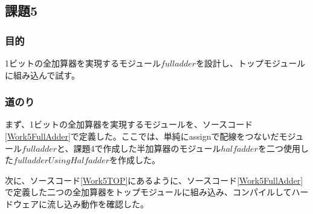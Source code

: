 \documentclass[a4paper]{jarticle}
\begin{document}
\subsection{課題5}
\subsubsection{目的}
1ビットの全加算器を実現するモジュール$fulladder$を設計し、トップモジュールに組み込んで試す。
\subsubsection{道のり}
まず、1ビットの全加算器を実現するモジュールを、ソースコード\ref{Work5FullAdder}で定義した。ここでは、単純にassignで配線をつないだモジュール$fulladder$と、課題4で作成した半加算器のモジュール$halfadder$を二つ使用した$fulladderUsingHalfadder$を作成した。

次に、ソースコード\ref{Work5TOP}にあるように、ソースコード\ref{Work5FullAdder}で定義した二つの全加算器をトップモジュールに組み込み、コンパイルしてハードウェアに流し込み動作を確認した。

\end{document}
